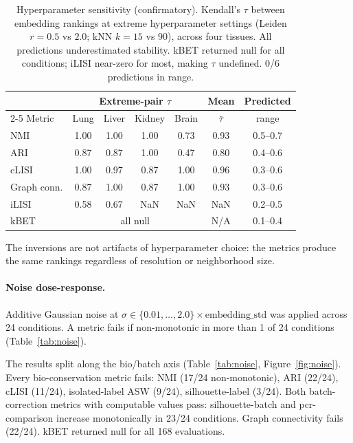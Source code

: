 \documentclass[11pt]{article}
\begin{document}
\begin{table}[t]
\centering
\caption{Hyperparameter sensitivity (confirmatory). Kendall's $\tau$ between embedding rankings at extreme hyperparameter settings (Leiden $r = 0.5$ vs $2.0$; kNN $k = 15$ vs $90$), across four tissues. All predictions underestimated stability. kBET returned null for all conditions; iLISI near-zero for most, making $\tau$ undefined. 0/6 predictions in range.}
\label{tab:hyperparam}
\small
\begin{tabular}{@{}lcccccc@{}}
\toprule
 & \multicolumn{4}{c}{Extreme-pair $\tau$} & Mean & Predicted \\
\cmidrule(lr){2-5}
Metric & Lung & Liver & Kidney & Brain & $\bar{\tau}$ & range \\
\midrule
NMI & 1.00 & 1.00 & 1.00 & 0.73 & 0.93 & 0.5--0.7 \\
ARI & 0.87 & 0.87 & 1.00 & 0.47 & 0.80 & 0.4--0.6 \\
cLISI & 1.00 & 0.97 & 0.87 & 1.00 & 0.96 & 0.3--0.6 \\
Graph conn. & 0.87 & 1.00 & 0.87 & 1.00 & 0.93 & 0.3--0.6 \\
iLISI & 0.58 & 0.67 & NaN & NaN & NaN & 0.2--0.5 \\
kBET & \multicolumn{4}{c}{all null} & N/A & 0.1--0.4 \\
\bottomrule
\end{tabular}
\end{table}

The inversions are not artifacts of hyperparameter choice: the metrics produce the same rankings regardless of resolution or neighborhood size.

\paragraph{Noise dose-response.} Additive Gaussian noise at $\sigma \in \{0.01, \ldots, 2.0\} \times \text{embedding\_std}$ was applied across 24 conditions. A metric fails if non-monotonic in more than 1 of 24 conditions (Table~\ref{tab:noise}).

The results split along the bio/batch axis (Table~\ref{tab:noise}, Figure~\ref{fig:noise}). Every bio-conservation metric fails: NMI (17/24 non-monotonic), ARI (22/24), cLISI (11/24), isolated-label ASW (9/24), silhouette-label (3/24). Both batch-correction metrics with computable values pass: silhouette-batch and pcr-comparison increase monotonically in 23/24 conditions. Graph connectivity fails (22/24). kBET returned null for all 168 evaluations.
\end{document}
